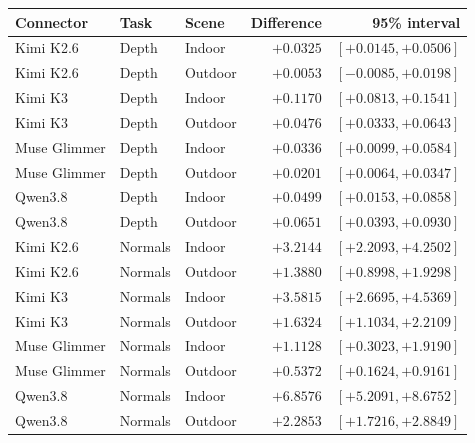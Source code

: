 \begin{tabular}{lllrr}
\toprule
Connector & Task & Scene & Difference & 95\% interval\\
\midrule
Kimi K2.6 & Depth & Indoor & $+0.0325$ & $[+0.0145, +0.0506]$\\
Kimi K2.6 & Depth & Outdoor & $+0.0053$ & $[-0.0085, +0.0198]$\\
Kimi K3 & Depth & Indoor & $+0.1170$ & $[+0.0813, +0.1541]$\\
Kimi K3 & Depth & Outdoor & $+0.0476$ & $[+0.0333, +0.0643]$\\
Muse Glimmer & Depth & Indoor & $+0.0336$ & $[+0.0099, +0.0584]$\\
Muse Glimmer & Depth & Outdoor & $+0.0201$ & $[+0.0064, +0.0347]$\\
Qwen3.8 & Depth & Indoor & $+0.0499$ & $[+0.0153, +0.0858]$\\
Qwen3.8 & Depth & Outdoor & $+0.0651$ & $[+0.0393, +0.0930]$\\
Kimi K2.6 & Normals & Indoor & $+3.2144$ & $[+2.2093, +4.2502]$\\
Kimi K2.6 & Normals & Outdoor & $+1.3880$ & $[+0.8998, +1.9298]$\\
Kimi K3 & Normals & Indoor & $+3.5815$ & $[+2.6695, +4.5369]$\\
Kimi K3 & Normals & Outdoor & $+1.6324$ & $[+1.1034, +2.2109]$\\
Muse Glimmer & Normals & Indoor & $+1.1128$ & $[+0.3023, +1.9190]$\\
Muse Glimmer & Normals & Outdoor & $+0.5372$ & $[+0.1624, +0.9161]$\\
Qwen3.8 & Normals & Indoor & $+6.8576$ & $[+5.2091, +8.6752]$\\
Qwen3.8 & Normals & Outdoor & $+2.2853$ & $[+1.7216, +2.8849]$\\
\bottomrule
\end{tabular}
